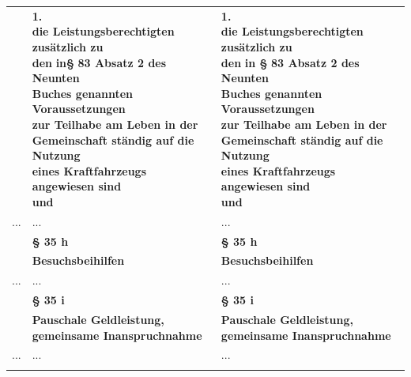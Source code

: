 \documentclass[10pt,a4paper,landscape]{article}
\begin{document}
\begin{longtable}{|L{8.2cm}|L{8.2cm}|L{8.2cm}|}
 & \textbf{1.   \newline die Leistungsberechtigten zusätzlich zu  \newline den }\textbf{\textcolor{diffred}{in\S{}}}\textbf{ 83 Absatz 2 des Neunten  \newline Buches genannten Voraussetzungen  \newline zur Teilhabe am Leben in der  \newline Gemeinschaft ständig auf die Nutzung  \newline eines Kraftfahrzeugs angewiesen sind  \newline und } & \textbf{1.   \newline die Leistungsberechtigten zusätzlich zu  \newline den }\textbf{\textcolor{diffgreen}{in \S{}}}\textbf{ 83 Absatz 2 des Neunten  \newline Buches genannten Voraussetzungen  \newline zur Teilhabe am Leben in der  \newline Gemeinschaft ständig auf die Nutzung  \newline eines Kraftfahrzeugs angewiesen sind  \newline und } \\
\hhline{|---|}
... & ... & ... \\
\hhline{|---|}
 & \textbf{\S{} 35 h } & \textbf{\S{} 35 h } \\
\hhline{|---|}
 & \textbf{Besuchsbeihilfen} & \textbf{Besuchsbeihilfen} \\
\hhline{|---|}
... & ... & ... \\
\hhline{|---|}
 & \textbf{\S{} 35 i } & \textbf{\S{} 35 i } \\
\hhline{|---|}
 & \textbf{Pauschale Geldleistung,  \newline gemeinsame Inanspruchnahme } & \textbf{Pauschale Geldleistung,  \newline gemeinsame Inanspruchnahme } \\
\hhline{|---|}
... & ... & ... \\
\hhline{|---|}

\end{longtable}
\end{document}
